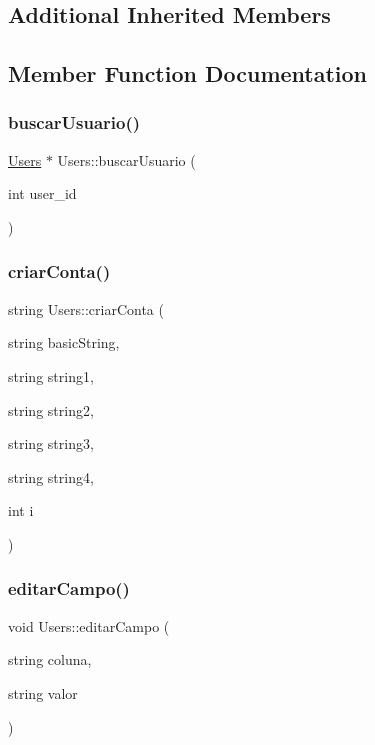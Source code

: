 \subsection*{Additional Inherited Members}


\subsection{Member Function Documentation}
\mbox{\label{class_users_a6d3ffcb60c10377572f0b7f3ee7c2556}} 
\subsubsection{\texorpdfstring{buscar\+Usuario()}{buscarUsuario()}}
{\footnotesize\ttfamily \hyperlink{class_users}{Users} $\ast$ Users\+::buscar\+Usuario (\begin{DoxyParamCaption}\item[{int}]{user\+\_\+id }\end{DoxyParamCaption})}

\mbox{\label{class_users_a8f42faf201c994b2b1b61a22a99b8d14}} 
\subsubsection{\texorpdfstring{criar\+Conta()}{criarConta()}}
{\footnotesize\ttfamily string Users\+::criar\+Conta (\begin{DoxyParamCaption}\item[{string}]{basic\+String,  }\item[{string}]{string1,  }\item[{string}]{string2,  }\item[{string}]{string3,  }\item[{string}]{string4,  }\item[{int}]{i }\end{DoxyParamCaption})}

\mbox{\label{class_users_a90566edb592304aff048110306eb61f3}} 
\subsubsection{\texorpdfstring{editar\+Campo()}{editarCampo()}}
{\footnotesize\ttfamily void Users\+::editar\+Campo (\begin{DoxyParamCaption}\item[{string}]{coluna,  }\item[{string}]{valor }\end{DoxyParamCaption})}

